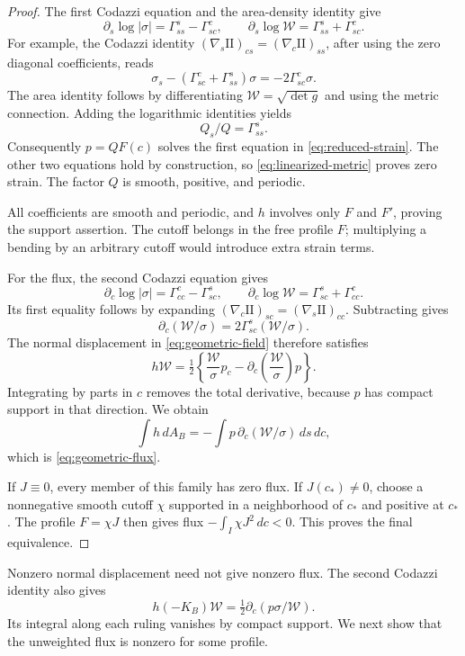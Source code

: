 \documentclass[11pt]{amsart}
\theoremstyle{definition}
\begin{document}
\begin{proof}
The first Codazzi equation and the area-density identity give
\[
 \partial_s\log|\sigma|=\Gamma^s_{ss}-\Gamma^c_{sc},
 \qquad
 \partial_s\log\mathcal W=\Gamma^s_{ss}+\Gamma^c_{sc}.
\]
For example, the Codazzi identity
$(\nabla_s\mathrm{II})_{cs}=(\nabla_c\mathrm{II})_{ss}$,
after using the zero diagonal coefficients, reads
\[
 \sigma_s-(\Gamma^c_{sc}+\Gamma^s_{ss})\sigma
                                      =-2\Gamma^c_{sc}\sigma.
\]
The area identity follows by differentiating
$\mathcal W=\sqrt{\det g}$ and using the metric connection.
Adding the logarithmic identities yields
\[
 Q_s/Q=\Gamma^s_{ss}.
\]
Consequently $p=QF(c)$ solves the first equation in
\eqref{eq:reduced-strain}. The other two equations hold by
construction, so \eqref{eq:linearized-metric} proves zero strain.
The factor $Q$ is smooth, positive, and periodic.

All coefficients are smooth and periodic, and $h$ involves only
$F$ and $F'$, proving the support assertion. The cutoff belongs in
the free profile $F$; multiplying a bending by an arbitrary cutoff
would introduce extra strain terms.

For the flux, the second Codazzi equation gives
\[
 \partial_c\log|\sigma|=\Gamma^c_{cc}-\Gamma^s_{sc},\qquad
 \partial_c\log\mathcal W=\Gamma^s_{sc}+\Gamma^c_{cc}.
\]
Its first equality follows by expanding
$(\nabla_c\mathrm{II})_{sc}=(\nabla_s\mathrm{II})_{cc}$.
Subtracting gives
\[
 \partial_c(\mathcal W/\sigma)
             =2\Gamma^s_{sc}(\mathcal W/\sigma).
\]
The normal displacement in \eqref{eq:geometric-field} therefore
satisfies
\[
 h\mathcal W=\tfrac12\left\{
       \frac{\mathcal W}{\sigma}p_c
       -\partial_c\left(\frac{\mathcal W}{\sigma}\right)p
                         \right\}.
\]
Integrating by parts in $c$ removes the total derivative, because
$p$ has compact support in that direction. We obtain
\[
 \int h\,dA_B
       =-\int p\,\partial_c(\mathcal W/\sigma)\,ds\,dc,
\]
which is \eqref{eq:geometric-flux}.

If $J\equiv0$, every member of this family has zero flux.
If $J(c_*)\ne0$, choose a nonnegative smooth cutoff $\chi$
supported in a neighborhood of $c_*$ and positive at $c_*$.
The profile $F=\chi J$ then gives flux
$-\int_I\chi J^2\,dc<0$. This proves the final equivalence.
\end{proof}

Nonzero normal displacement need not give nonzero flux.
The second Codazzi identity also gives
\[
 h(-K_B)\mathcal W
      =\tfrac12\partial_c(p\sigma/\mathcal W).
\]
Its integral along each ruling vanishes by compact support.
We next show that the unweighted flux is nonzero for some profile.
\end{document}
